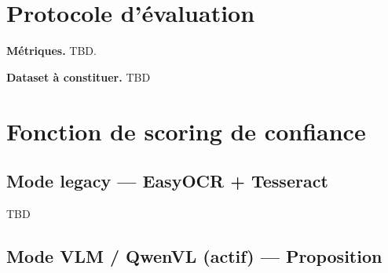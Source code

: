 \section{Protocole d'évaluation}

\noindent\textbf{Métriques.} TBD.

\noindent\textbf{Dataset à constituer.}  TBD 

\section{Fonction de scoring de confiance}

\subsection{Mode legacy --- EasyOCR + Tesseract}



TBD
\subsection{Mode VLM / QwenVL (actif) --- Proposition}





